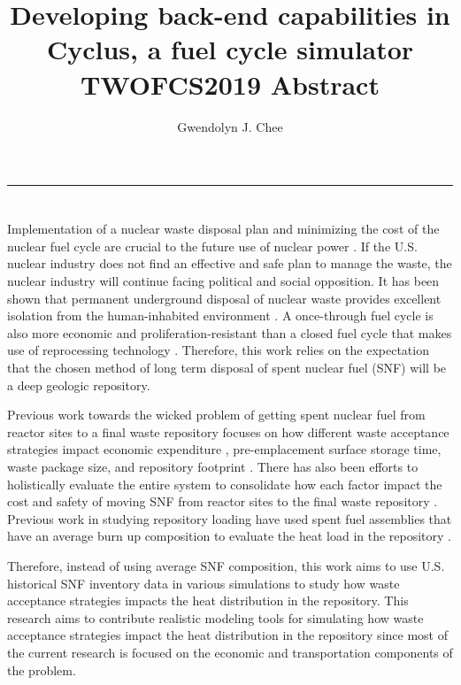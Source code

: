 \documentclass[11pt, letterpaper]{article}
\title{Developing back-end capabilities in Cyclus, a fuel cycle simulator
        \\ \vspace{0.5em} TWOFCS2019 Abstract}
\author{Gwendolyn J. Chee}
\renewcommand *\footnoterule{}
\begin{document}
	\maketitle
	\hrule

\section * {}
\doublespacing
Implementation of a nuclear waste disposal plan and minimizing the cost of the 
nuclear fuel cycle are crucial to the future use of nuclear power 
\cite{massachusetts_institute_of_technology_future_2003}. 
If the U.S. nuclear industry does not find an effective and safe plan to manage 
the waste, the nuclear industry will continue facing political and social 
opposition. 
It has been shown that permanent underground disposal of nuclear waste provides
excellent isolation from the human-inhabited environment 
\cite{rechard_evolution_2014}. 
A once-through fuel cycle is also more economic and proliferation-resistant than 
a closed fuel cycle that makes use of reprocessing technology
\cite{massachusetts_institute_of_technology_future_2003}.
Therefore, this work relies on the expectation that the chosen method of long 
term disposal of spent nuclear fuel (SNF) will be a deep geologic repository. 

Previous work towards the wicked problem of getting spent nuclear fuel from reactor 
sites to a final waste repository focuses on how different waste acceptance strategies 
impact economic expenditure \cite{nesbit_proposed_2015}, pre-emplacement 
surface storage time, waste package size, and repository 
footprint \cite{greenberg_application_2012}. 
There has also been efforts to holistically evaluate the entire system to consolidate 
how each factor impact the cost and safety of moving SNF from 
reactor sites to the final waste repository \cite{nutt_waste_2015}.
Previous work in studying repository loading have used spent fuel assemblies 
that have an average burn up composition \cite{johnson_optimizing_2016} 
to evaluate the heat load in the repository \cite{greenberg_application_2012}. 

Therefore, instead of using average SNF composition, this work aims to use U.S. 
historical SNF inventory data \cite{peterson_unf_standards_2017} in various 
simulations to study how waste acceptance strategies impacts the heat distribution
in the repository. 
This research aims to contribute realistic modeling tools for simulating how 
waste acceptance strategies impact the heat distribution in the repository 
since most of the current research is focused on the economic and 
transportation components of the problem. 
\end{document}
